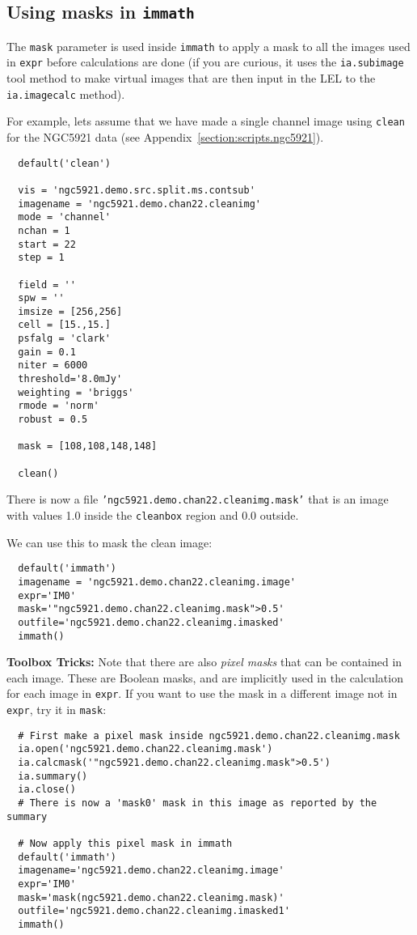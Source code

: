\subsection{Using masks in {\tt immath}}
\label{section:analysis.immath.masks}

The {\tt mask} parameter is used inside {\tt immath} to apply a
mask to all the images used in {\tt expr} before calculations
are done (if you are curious, it uses the {\tt ia.subimage} tool
method to make virtual images that are then input in the LEL to the 
{\tt ia.imagecalc} method).

For example, lets assume that we have made a single channel image
using {\tt clean} for the NGC5921 data (see
Appendix~\ref{section:scripts.ngc5921}).
\small
\begin{verbatim}
  default('clean')
  
  vis = 'ngc5921.demo.src.split.ms.contsub'
  imagename = 'ngc5921.demo.chan22.cleanimg'
  mode = 'channel'
  nchan = 1
  start = 22
  step = 1
  
  field = ''
  spw = ''
  imsize = [256,256]
  cell = [15.,15.]
  psfalg = 'clark'
  gain = 0.1
  niter = 6000
  threshold='8.0mJy'
  weighting = 'briggs'
  rmode = 'norm'
  robust = 0.5
  
  mask = [108,108,148,148]
  
  clean()
\end{verbatim}
\normalsize
There is now a file {\tt 'ngc5921.demo.chan22.cleanimg.mask'} that is
an image with values 1.0 inside the {\tt cleanbox} region and 0.0
outside.  

We can use this to mask the clean image:
\small
\begin{verbatim}
  default('immath')
  imagename = 'ngc5921.demo.chan22.cleanimg.image'
  expr='IM0'
  mask='"ngc5921.demo.chan22.cleanimg.mask">0.5'
  outfile='ngc5921.demo.chan22.cleanimg.imasked'
  immath()
\end{verbatim}
\normalsize

{\bf Toolbox Tricks:}
Note that there are also {\it pixel masks} that can be contained in each
image.  These are Boolean masks, and are implicitly used in the
calculation for each image in {\tt expr}.  If you want to use the
mask in a different image not in {\tt expr}, try it in {\tt mask}:
\small
\begin{verbatim}
  # First make a pixel mask inside ngc5921.demo.chan22.cleanimg.mask
  ia.open('ngc5921.demo.chan22.cleanimg.mask')
  ia.calcmask('"ngc5921.demo.chan22.cleanimg.mask">0.5')
  ia.summary()
  ia.close()
  # There is now a 'mask0' mask in this image as reported by the summary

  # Now apply this pixel mask in immath
  default('immath')
  imagename='ngc5921.demo.chan22.cleanimg.image'
  expr='IM0'
  mask='mask(ngc5921.demo.chan22.cleanimg.mask)'
  outfile='ngc5921.demo.chan22.cleanimg.imasked1'
  immath()
\end{verbatim}
\normalsize


